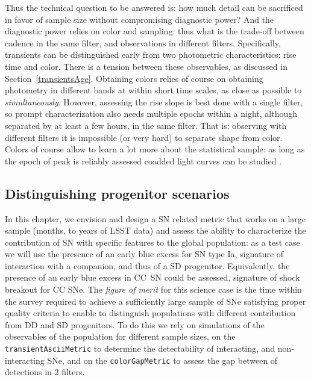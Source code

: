 Thus the technical question to be answered is: how much detail can be
sacrificed in favor of sample size without compromising diagnostic
power? And the diagnostic power relies on color and sampling: thus
what is the trade-off between cadence in the same filter, and
observations in different filters. Specifically, transients can be
distinguished early from two photometric characteristics: rise time
and color. There is a tension between these observables, as discussed
in Section~\ref{transientsAge}. Obtaining colors relies of course on
obtaining photometry in different bands at within short time scales,
as close as possible to \emph{simultaneously}. However, assessing the
rise slope is best done with a single filter, so prompt
characterization also needs multiple epochs within a night, although
separated by at least a few hours, in the same filter. That is:
observing with different filters it is impossible (or very hard) to
separate shape from color. Colors of course allow to learn a lot more
about the statistical sample: as long as the epoch of peak is reliably
assessed coadded light curves can be studied \citep{Bianco11}.

\subsection{Distinguishing progenitor scenarios}
In this chapter, we envision and design a SN related metric that works
on a large sample (months, to years of LSST data) and assess the
ability to characterize the contribution of SN with specific features
to the global population: as a test case we will use the presence of
an early blue excess for SN type Ia, signature of interaction with a
companion, and thus of a SD progenitor. Equivalently, the presence of
an early blue excess in CC~SN could be assessed, signature of shock
breakout for CC SNe. The \emph{figure of merit} for this science case
is the time within the survey required to achieve a sufficiently large
sample of SNe satisfying proper quality criteria to enable to
distinguish populations with different contribution from DD and SD
progenitors.  To do this we rely on simulations of the observables of
the population for different sample sizes, on the
\texttt{transientAsciiMetric} to determine the detectability of
interacting, and non-interacting SNe, and on the
\texttt{colorGapMetric} to assess the gap between of detections in 2
filters.

